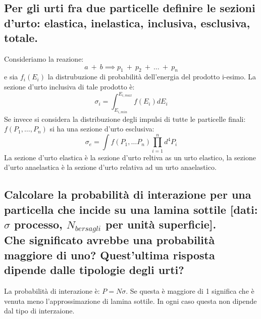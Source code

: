 \subsection[$\ $ Sezione d'urto elastica, inclusiva, esclusiva e totale per urti tra particelle]{Per gli urti fra due particelle definire le sezioni d'urto: elastica, inelastica, inclusiva, esclusiva, totale.}
Consideriamo la reazione:
\[
	a \ + \ b \implies p_1 \ + \ p_2 \ + \ \ldots \ + \ p_n
\] 
e sia $f_i\left( E_i \right) $ la distrubuzione di probabilità dell'energia del prodotto i-esimo. La sezione d'urto inclusiva di tale prodotto è:
\[
	\sigma_i = \int_{E_{i, min}}^{E_{i,max}} f\left( E_{i} \right) dE_{i}
\]
Se invece si considera la distribuzione degli impulsi di tutte le particelle finali: $f\left( P_{1}, \ldots , P_{n} \right) $ si ha una sezione d'urto esclusiva:
\[
	\sigma_e = \int f\left( P_{1}, \ldots P_{n} \right) \prod_{i = 1}^{n}d^{4}P_i  
\] 
La sezione d'urto elastica è la sezione d'urto reltiva as un urto elastico, la sezione d'urto anaelastica è la sezione d'urto relativa ad un urto anaelastico.

\subsection[$\ $ Probabilità di interazione di particella su lamina sottile]{Calcolare la probabilità di interazione per una particella che incide su una lamina sottile [dati: $\sigma$ processo, $N_{bersagli}$ per unità superficie].\\
Che significato avrebbe una probabilità maggiore di uno? Quest'ultima risposta dipende dalle tipologie degli urti?}
La probabilità di interazione è: $P = N \sigma $. Se  questa è maggiore di 1 significa che è venuta meno l'approssimazione di lamina sottile. In ogni caso questa non dipende dal tipo di interzaione.

